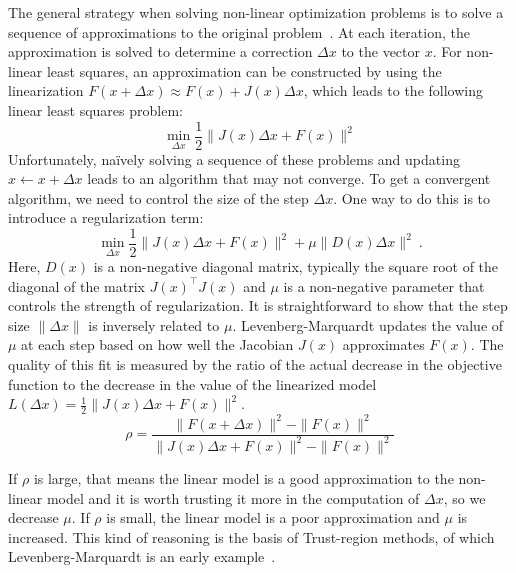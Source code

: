The general strategy when solving non-linear optimization problems is to solve a sequence of approximations to the original problem~\cite{nocedal2000numerical}. At each iteration, the approximation is solved to determine a correction $\Delta x$ to the vector $x$. For non-linear least squares, an approximation can be constructed by using the linearization $F(x+\Delta x) \approx F(x) + J(x)\Delta x$, which leads to the following linear least squares  problem:
\begin{equation}
         \min_{\Delta x} \frac{1}{2}\|J(x)\Delta x + F(x)\|^2
        \label{eq:linearapprox}
\end{equation}
Unfortunately, na\"ively solving a sequence of these problems and updating $x \leftarrow x+ \Delta x$ leads to an algorithm that may not converge.  To get a convergent algorithm, we need to control the size of the step $\Delta x$.  One way to do this is to introduce a regularization term:
\begin{equation}
         \min_{\Delta x} \frac{1}{2}\|J(x)\Delta x + F(x)\|^2 + \mu \|D(x)\Delta x\|^2\ .
        \label{eq:lsqr}
\end{equation}
Here, $D(x)$ is a non-negative diagonal matrix, typically the square root of the diagonal of the matrix $J(x)^\top J(x)$ and $\mu$ is a non-negative parameter that controls the strength of regularization. It is straightforward to show that the step size $\|\Delta x\|$ is inversely related to $\mu$. Levenberg-Marquardt updates the value of $\mu$ at each step based on how well the Jacobian $J(x)$ approximates $F(x)$. The quality of this fit is measured by the ratio of  the actual decrease in the objective function to the decrease in the value of the linearized model $L(\Delta x) = \frac{1}{2}\|J(x)\Delta x + F(x)\|^2$.
\begin{equation}
\rho = \frac{\|F(x + \Delta x)\|^2 - \|F(x)\|^2}{\|J(x)\Delta x + F(x)\|^2 - \|F(x)\|^2}
\end{equation}

If $\rho$ is large, that means the linear model is a good approximation to the non-linear model and it is worth trusting it more in the computation of $\Delta x$, so we decrease $\mu$. If $\rho$ is small, the linear model is a poor approximation and $\mu$ is increased. This kind of reasoning is the basis of Trust-region methods, of which Levenberg-Marquardt is an early example~\cite{nocedal2000numerical}.

